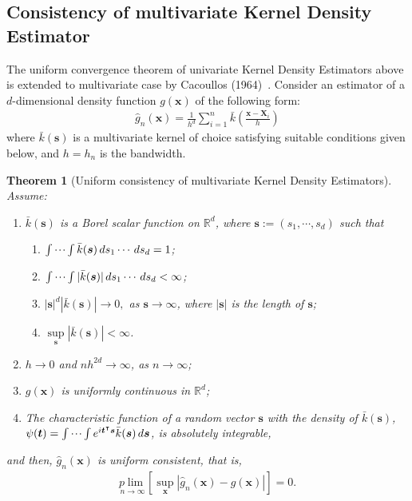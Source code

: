 \documentclass[12pt]{article}
\newtheorem{theorem}{Theorem}[section]
\begin{document}
\subsection{Consistency of multivariate Kernel Density Estimator }
The uniform convergence theorem of univariate Kernel Density Estimators above is extended to multivariate case by Cacoullos (1964)~\cite{Theo}. Consider an estimator of a $d$-dimensional density function $g(\boldsymbol{x})$ of the following form:
\begin{gather*}
\widehat{g}_n(\boldsymbol{x}) = \frac{1}{h^{d}} \sum_{i=1}^{n}\bar{k}\left( \frac{\boldsymbol{x} - \boldsymbol{X}_i}{h}\right)
\end{gather*}
where $\bar{k}(\boldsymbol{s})$ is a multivariate kernel of choice satisfying suitable conditions given below, and $h = h_n$ is the bandwidth. 
\begin{theorem}[Uniform consistency of multivariate Kernel Density Estimators]~\cite{Theo}
	Assume:
	\begin{enumerate}
		\item $\bar{k}(\boldsymbol{s})$ is a Borel scalar function on $\mathbb{R}^{d}$, where $\boldsymbol{s} := (s_1, \cdots, s_{d})$ such that 
		\begin{enumerate}
			\item $\idotsint \bar{k}(\boldsymbol{s}) \,ds_1\cdots \,ds_{d} = 1$;
			\item $\idotsint | \bar{k}(\boldsymbol{s}) | \,ds_1\cdots \,ds_{d}<\infty$;
			\item $|\boldsymbol{s}|^{d}|\bar{k}(\boldsymbol{s})| \to 0,$ as $\boldsymbol{s} \to \infty$, where $|\boldsymbol{s}|$ is the length of $\boldsymbol{s}$;
			\item $\underset{\boldsymbol{s}}{\sup} | \bar{k}(\boldsymbol{s}) | < \infty$.
		\end{enumerate}
		\item $h \to 0$ and $nh^{2d} \to \infty$, as $n \to \infty$;
		\item $g(\boldsymbol{x})$ is uniformly continuous in $\mathbb{R}^{d}$;
		\item The characteristic function of a random vector $\boldsymbol{s}$ with the density  of $\bar{k}(\boldsymbol{s})$, $\psi(\boldsymbol{t}) = \idotsint e^{i\boldsymbol{t}^{\intercal}\boldsymbol{s}} \bar{k}(\boldsymbol{s})\,d\boldsymbol{s}$,  is absolutely integrable,
	\end{enumerate}
	and then, $\widehat{g}_n(\boldsymbol{x})$ is uniform consistent, that is,
	\begin{gather*}
	\underset{n \to \infty}{p\lim}  \left[ \underset{\boldsymbol{x}}{\sup} \left|\widehat{g}_n(\boldsymbol{x}) - g(\boldsymbol{x}) \right| \right] = 0.
	\end{gather*}
\end{theorem}
\end{document}
